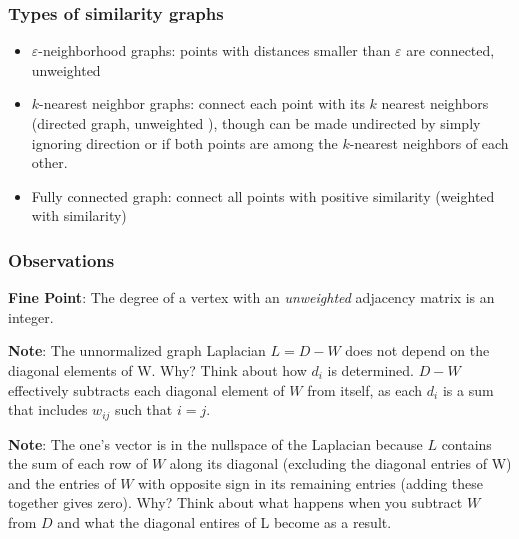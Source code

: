 \documentclass{article}
\begin{document}
{        \subsubsection{Types of similarity graphs}
        \begin{itemize}
        \item\ensuremath{\varepsilon}-neighborhood graphs: points with distances
smaller than \ensuremath{\varepsilon} are connected, unweighted
        \item\ensuremath{k}-nearest neighbor graphs: connect each point with its
\ensuremath{k} nearest neighbors (directed graph, unweighted ), though can be
made undirected by simply ignoring direction or if both points are among the
\ensuremath{k}-nearest neighbors of each other.
        \item Fully connected graph: connect all points with positive
similarity (weighted with similarity)
        \end{itemize}
        \subsubsection{Observations} 
        \textbf{Fine Point}: The degree of a vertex with an \emph{unweighted}
adjacency matrix is an integer. 

        \textbf{Note}: The unnormalized graph Laplacian
\ensuremath{L = D - W} does not depend on the diagonal elements of W. Why? Think
about how \ensuremath{d_{i}} is determined. \ensuremath{D - W} effectively
subtracts each diagonal element of \ensuremath{W} from itself, as each
\ensuremath{d_{i}} is a sum that includes \ensuremath{w_{ij}} such that
\ensuremath{i=j}.  
        
        \textbf{Note}: The one's vector is in the nullspace of the Laplacian
because \ensuremath{L} contains the sum of each row of \ensuremath{W} along its
diagonal (excluding the diagonal entries of W) and the entries of \ensuremath{W}
with opposite sign in its remaining entries (adding these together gives zero).
Why? Think about what happens when you subtract \ensuremath{W} from
\ensuremath{D} and what the diagonal entires of L become as a result.

}
\end{document}
